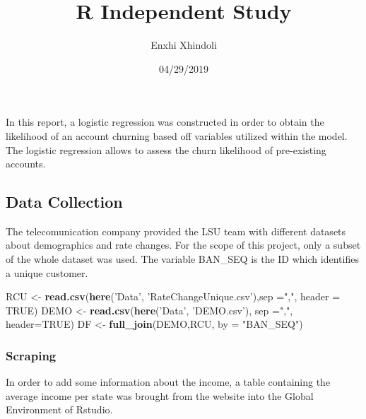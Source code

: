 \documentclass[]{article}
\title{R Independent Study}
\author{Enxhi Xhindoli}
\date{04/29/2019}
\newenvironment{Shaded}{\begin{snugshade}}{\end{snugshade}}
\newcommand{\KeywordTok}[1]{\textcolor[rgb]{0.13,0.29,0.53}{\textbf{#1}}}
\newcommand{\DataTypeTok}[1]{\textcolor[rgb]{0.13,0.29,0.53}{#1}}
\newcommand{\StringTok}[1]{\textcolor[rgb]{0.31,0.60,0.02}{#1}}
\newcommand{\OtherTok}[1]{\textcolor[rgb]{0.56,0.35,0.01}{#1}}
\newcommand{\OperatorTok}[1]{\textcolor[rgb]{0.81,0.36,0.00}{\textbf{#1}}}
\newcommand{\NormalTok}[1]{#1}
\begin{document}
\maketitle

In this report, a logistic regression was constructed in order to obtain
the likelihood of an account churning based off variables utilized
within the model. The logistic regression allows to assess the churn
likelihood of pre-existing accounts.

\subsection{Data Collection}\label{data-collection}

The telecomunication company provided the LSU team with different
datasets about demographics and rate changes. For the scope of this
project, only a subset of the whole dataset was used. The variable
BAN\_SEQ is the ID which identifies a unique customer.

\begin{Shaded}
\begin{Highlighting}[]
\NormalTok{RCU <-}\StringTok{ }\KeywordTok{read.csv}\NormalTok{(}\KeywordTok{here}\NormalTok{(}\StringTok{'Data'}\NormalTok{, }\StringTok{'RateChangeUnique.csv'}\NormalTok{),}\DataTypeTok{sep =}\StringTok{","}\NormalTok{, }\DataTypeTok{header =} \OtherTok{TRUE}\NormalTok{)}
\NormalTok{DEMO <-}\StringTok{ }\KeywordTok{read.csv}\NormalTok{(}\KeywordTok{here}\NormalTok{(}\StringTok{'Data'}\NormalTok{, }\StringTok{'DEMO.csv'}\NormalTok{), }\DataTypeTok{sep =}\StringTok{","}\NormalTok{, }\DataTypeTok{header=}\OtherTok{TRUE}\NormalTok{)}
\NormalTok{DF <-}\StringTok{ }\KeywordTok{full_join}\NormalTok{(DEMO,RCU, }\DataTypeTok{by =} \StringTok{"BAN_SEQ"}\NormalTok{)}
\end{Highlighting}
\end{Shaded}

\subsubsection{Scraping}\label{scraping}

In order to add some information about the income, a table containing
the average income per state was brought from the website into the
Global Environment of Rstudio.

\begin{Shaded}
\end{Shaded}
\end{document}
